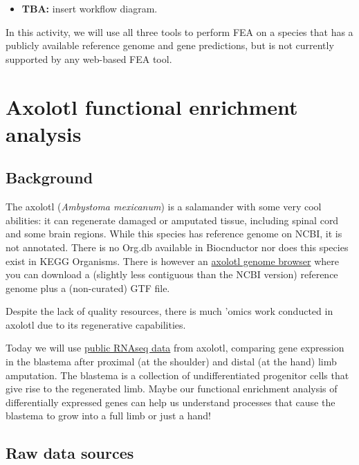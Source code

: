 \documentclass[
]{book}
\providecommand{\tightlist}{%
  \setlength{\itemsep}{0pt}\setlength{\parskip}{0pt}}
\begin{document}
\begin{itemize}
\tightlist
\item
  \textbf{TBA:} insert workflow diagram.
\end{itemize}

In this activity, we will use all three tools to perform FEA on a species that has a publicly available reference genome and gene predictions, but is not currently supported by any web-based FEA tool.

\hypertarget{axolotl-functional-enrichment-analysis}{%
\section{Axolotl functional enrichment analysis}\label{axolotl-functional-enrichment-analysis}}

\hypertarget{background}{%
\subsection{Background}\label{background}}

The axolotl (\emph{Ambystoma mexicanum}) is a salamander with some very cool abilities: it can regenerate damaged or amputated tissue, including spinal cord and some brain regions. While this species has reference genome on NCBI, it is not annotated. There is no Org.db available in Biocnductor nor does this species exist in KEGG Organisms. There is however an \href{https://www.axolotl-omics.org/}{axolotl genome browser} where you can download a (slightly less contiguous than the NCBI version) reference genome plus a (non-curated) GTF file.

Despite the lack of quality resources, there is much 'omics work conducted in axolotl due to its regenerative capabilities.

Today we will use \href{https://www.ncbi.nlm.nih.gov/pmc/articles/PMC5419050/\#SD7}{public RNAseq data} from axolotl, comparing gene expression in the blastema after proximal (at the shoulder) and distal (at the hand) limb amputation. The blastema is a collection of undifferentiated progenitor cells that give rise to the regenerated limb. Maybe our functional enrichment analysis of differentially expressed genes can help us understand processes that cause the blastema to grow into a full limb or just a hand!

\hypertarget{raw-data-sources}{%
\subsection{Raw data sources}\label{raw-data-sources}}
\end{document}
